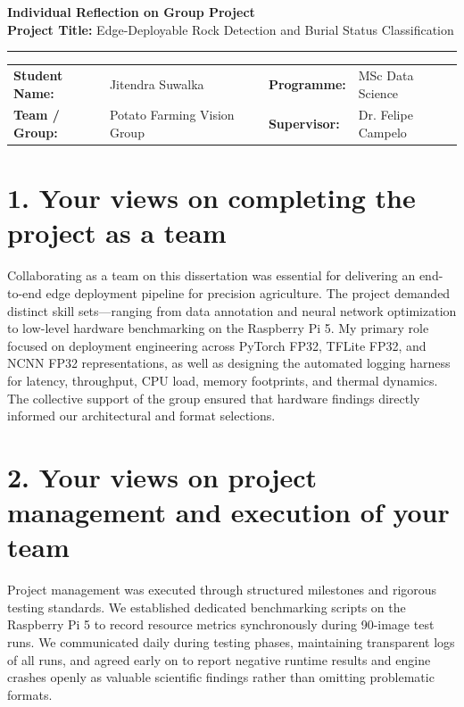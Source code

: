 \documentclass[11pt, a4paper]{article}
\begin{document}
\begin{center}
    {\Large \bfseries Individual Reflection on Group Project} \\[0.3em]
    {\small \textbf{Project Title:} Edge-Deployable Rock Detection and Burial Status Classification} \\[0.2em]
    \rule{\textwidth}{1pt}
\end{center}

\vspace{-0.5em}
\noindent
\begin{tabular}{@{}ll p{2cm} ll@{}}
    \textbf{Student Name:} & Jitendra Suwalka & & \textbf{Programme:} & MSc Data Science \\
    \textbf{Team / Group:} & Potato Farming Vision Group & & \textbf{Supervisor:} & Dr. Felipe Campelo \\
\end{tabular}

\vspace{0.2em}

\section*{1. Your views on completing the project as a team}
Collaborating as a team on this dissertation was essential for delivering an end-to-end edge deployment pipeline for precision agriculture. The project demanded distinct skill sets---ranging from data annotation and neural network optimization to low-level hardware benchmarking on the Raspberry Pi 5. My primary role focused on deployment engineering across PyTorch FP32, TFLite FP32, and NCNN FP32 representations, as well as designing the automated logging harness for latency, throughput, CPU load, memory footprints, and thermal dynamics. The collective support of the group ensured that hardware findings directly informed our architectural and format selections.

\section*{2. Your views on project management and execution of your team}
Project management was executed through structured milestones and rigorous testing standards. We established dedicated benchmarking scripts on the Raspberry Pi 5 to record resource metrics synchronously during 90-image test runs. We communicated daily during testing phases, maintaining transparent logs of all runs, and agreed early on to report negative runtime results and engine crashes openly as valuable scientific findings rather than omitting problematic formats.
\end{document}
